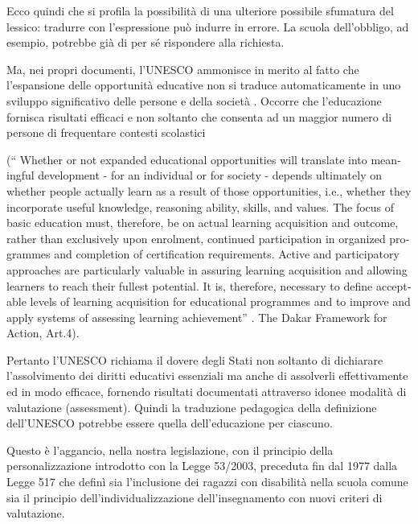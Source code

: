 \begin{description}
\begin{enumerate}
		Ecco quindi che si profila la possibilità di una ulteriore possibile sfumatura del lessico: tradurre 
		 con l'espressione  può indurre in errore. La scuola
		dell'obbligo, ad esempio, potrebbe già di per sé rispondere alla richiesta.
	
		Ma, nei propri documenti, l'UNESCO ammonisce in merito al fatto che l'espansione delle opportunità 
		educative non si traduce automaticamente in uno sviluppo significativo delle persone e della società .
		Occorre che l'educazione fornisca risultati efficaci e non soltanto che consenta ad un maggior numero
		di persone di frequentare contesti scolastici 
		\begin{otherlanguage}{english}
	(“ Whether or not expanded educational opportunities will
	translate into meaningful development - for an individual or for society - depends ultimately on whether
	people actually learn as a result of those opportunities, i.e., whether they incorporate useful knowledge,
	reasoning ability, skills, and values. The focus of basic education must, therefore, be on actual learning
	acquisition and outcome, rather than exclusively upon enrolment, continued participation in organized
	programmes and completion of certification requirements. Active and participatory approaches are
	particularly valuable in assuring learning acquisition and allowing learners to reach their fullest potential.
	It is, therefore, necessary to define acceptable levels of learning acquisition for educational programmes
	and to improve and apply systems of assessing learning achievement” . The Dakar Framework for
	Action, Art.4). 
		\end{otherlanguage}
		
		Pertanto l'UNESCO richiama il dovere degli Stati non soltanto di dichiarare l'assolvimento dei diritti
		educativi essenziali ma anche di assolverli effettivamente ed in modo efficace, fornendo risultati
		documentati attraverso idonee modalità di valutazione (assessment).
		Quindi la traduzione pedagogica della definizione dell'UNESCO potrebbe essere quella dell'educazione
		per ciascuno.
		
		Questo è l'aggancio, nella nostra legislazione, con il principio della personalizzazione introdotto con la
		Legge 53/2003, preceduta fin dal 1977 dalla Legge 517 che definì sia l'inclusione dei ragazzi con
		disabilità nella scuola comune sia il principio dell'individualizzazione dell'insegnamento con nuovi
		criteri di valutazione.
		

\end{enumerate}
\end{description}
